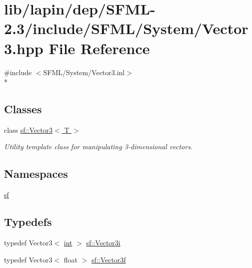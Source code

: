 \hypertarget{lapin_2dep_2_s_f_m_l-2_83_2include_2_s_f_m_l_2_system_2_vector3_8hpp}{\section{lib/lapin/dep/\-S\-F\-M\-L-\/2.3/include/\-S\-F\-M\-L/\-System/\-Vector3.hpp File Reference}
\label{lapin_2dep_2_s_f_m_l-2_83_2include_2_s_f_m_l_2_system_2_vector3_8hpp}
}
{\ttfamily \#include $<$S\-F\-M\-L/\-System/\-Vector3.\-inl$>$}\\*
\subsection*{Classes}
\begin{DoxyCompactItemize}
\item 
class \hyperlink{classsf_1_1_vector3}{sf\-::\-Vector3$<$ T $>$}
\begin{DoxyCompactList}\small\item\em Utility template class for manipulating 3-\/dimensional vectors. \end{DoxyCompactList}\end{DoxyCompactItemize}
\subsection*{Namespaces}
\begin{DoxyCompactItemize}
\item 
\hyperlink{namespacesf}{sf}
\end{DoxyCompactItemize}
\subsection*{Typedefs}
\begin{DoxyCompactItemize}
\item 
typedef Vector3$<$ \hyperlink{term__entry_8h_ad65b480f8c8270356b45a9890f6499ae}{int} $>$ \hyperlink{namespacesf_ae33ba51125c097a0aa1b32e20b6e96cd}{sf\-::\-Vector3i}
\item 
typedef Vector3$<$ float $>$ \hyperlink{namespacesf_a36e44d9e6d8f649703698ec9d24ac052}{sf\-::\-Vector3f}
\end{DoxyCompactItemize}
